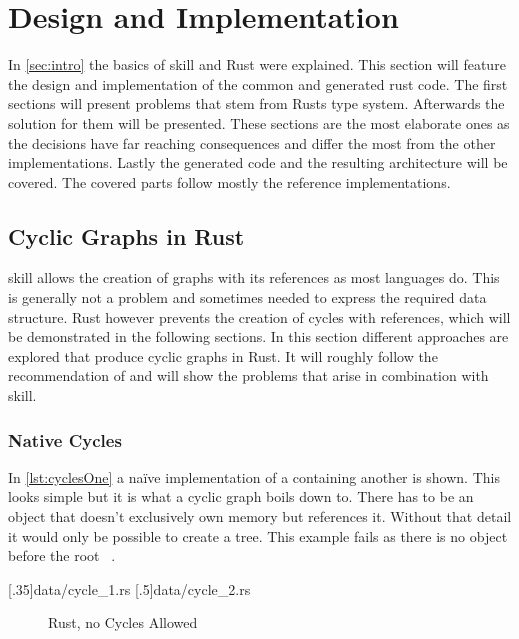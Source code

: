 \documentclass[thesis]{subfiles}
\begin{document}
\chapter{Design and Implementation}
In \autoref{sec:intro} the basics of \gls{skill} and Rust were explained.
This section will feature the design and implementation of the common and generated rust code.
The first sections will present problems that stem from Rusts type system.
Afterwards the solution for them will be presented.
These sections are the most elaborate ones as the decisions have far reaching consequences and differ the most from the other implementations.
Lastly the generated code and the resulting architecture will be covered.
The covered parts follow mostly the reference implementations.

\section{Cyclic Graphs in Rust}\label{sec:graph}
  \gls{skill} allows the creation of graphs with its references\autocite[9]{skill-dis} as most languages do.
  This is generally not a problem and sometimes needed to express the required data structure.
  Rust however prevents the creation of cycles with references, which will be demonstrated in the following sections.
  In this section different approaches are explored that produce cyclic graphs in Rust.
  It will roughly follow the recommendation of \autocite{rust-faq} and will show the problems that arise in combination with \gls{skill}.

  \subsection{Native Cycles}
    In \autoref{lst:cyclesOne} a na\"ive implementation of a \Node containing another \Node is shown.
    This looks simple but it is what a cyclic graph boils down to.
    There has to be an object that doesn't exclusively own memory but references it.
    Without that detail it would only be possible to create a tree.
    This example fails as there is no \Node object before the root \Node~.

    \LstTikzBox{\cyclesOne}[.35\linewidth]{data/cycle_1.rs}
    \LstTikzBox{\cyclesTwo}[.5\linewidth]{data/cycle_2.rs}

    \begin{figure}[ht]
      \captionsetup{type=lstlisting}
       \hfill%
      \caption{Rust, no Cycles Allowed}\label{lst:cycles}
    \end{figure}
\end{document}
